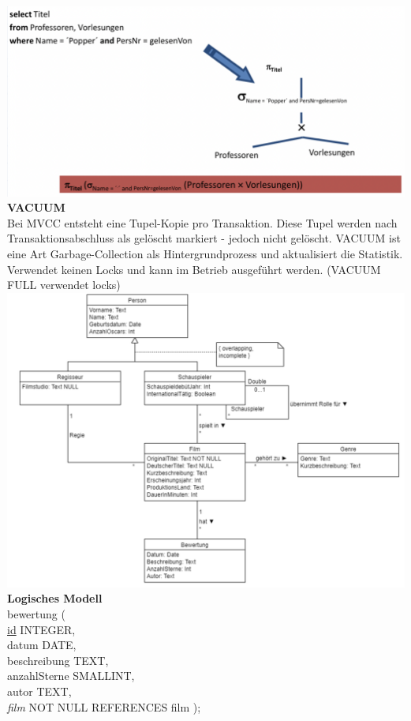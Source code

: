 \documentclass[7pt,landscape,a4paper]{scrartcl}
\begin{document}
\begin{multicols*}{4}
\includegraphics[width=\linewidth]{optimierung}\\
\textbf{VACUUM}\\
Bei MVCC entsteht eine Tupel-Kopie pro Transaktion. Diese Tupel werden nach Transaktionsabschluss als gelöscht markiert - jedoch nicht gelöscht. VACUUM ist eine Art Garbage-Collection als Hintergrundprozess und aktualisiert die Statistik. Verwendet keinen Locks und kann im Betrieb ausgeführt werden. (VACUUM FULL verwendet locks)
\includegraphics[width=\linewidth]{uml}
\textbf{Logisches Modell}\\
bewertung (\\
\underline{id} INTEGER,\\
datum DATE,\\
beschreibung TEXT, \\
anzahlSterne SMALLINT,\\
autor TEXT,\\
\textit{film} NOT NULL REFERENCES film
);

\end{multicols*}
\end{document}
